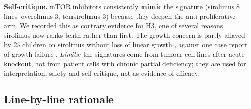 \documentclass[10pt]{article}
\begin{document}
\textbf{Self-critique.} mTOR inhibitors consistently \textbf{mimic} the signature (sirolimus 8 lines, everolimus 3,
temsirolimus 3) because they deepen the anti-proliferative arm. We recorded this as contrary evidence for H3, one
of several reasons sirolimus now ranks tenth rather than first. The growth concern is partly allayed by 25
children on sirolimus without loss of linear growth \citep{hymes}, against one case report of growth failure
\citep{rangel}. \textit{Limits:} the signatures come from tumour cell lines after acute knockout, not from patient
cells with chronic partial deficiency; they are used for interpretation, safety and self-critique, not as evidence
of efficacy.

\subsection{Line-by-line rationale}
\end{document}
